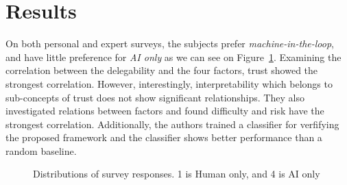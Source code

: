 \documentclass[10pt,twocolumn,letterpaper]{article}
\begin{document}
\section{Results}
On both personal and expert surveys, the subjects prefer \textit{machine-in-the-loop}, and have little preference for \textit{AI only} as we can see on Figure~\ref{fig:dist}. Examining the correlation between the delegability and the four factors, trust showed the strongest correlation. However, interestingly, interpretability which belongs to sub-concepts of trust does not show significant relationships. They also investigated relations between factors and found difficulty and risk have the strongest correlation. Additionally, the authors trained a classifier for verfifying the proposed framework and the classifier shows better performance than a random baseline.


\begin{figure}[b]
	\centering
	\caption{Distributions of survey responses. 1 is Human only, and 4 is AI only}
	\label{fig:dist}
\end{figure}


{\small

%
}


\begin{table}[t]
	\centering
	\caption{
		An overview of the four factors in the framework.
	}\label{tab:four_factors}
\end{table}
\end{document}
